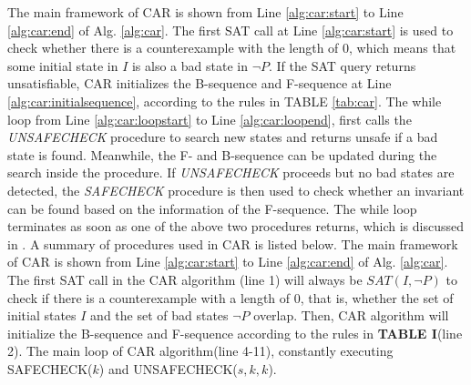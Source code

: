 \iffalse
The CAR algorithm persistently generates new elements and then insert them into F-sequence or B-sequence through repeating calls to the SAT solver until either Safety Check or Unsafety check in TABLE I returns true. Obviously, the $Sys$ holds the property $P$ when Safety Check returns true, while a counterexample is found when UnSafety Check returns true. We will describe the CAR algorithm. followed by the heuristics of the restart policy. 

Here we demonstrate the top-level procedure of CAR algorithm, which is implemented in hundreds of lines of C++. The algorithm takes a system $Sys=(V,I,T)$ and a safety property $P$ as inputs, and the output will be safety when the algorithm finds an invariant to prove the $Sys$ satisfied $P$ or return unsafe when a counterexample is found. \textbf{The Text in red is related to restart policy, please ignore them temporarily}.
\fi 



The main framework of CAR is shown from Line \ref{alg:car:start} to Line \ref{alg:car:end} of Alg. \ref{alg:car}. The first SAT call at Line \ref{alg:car:start} is used to check whether there is a counterexample with the length of $0$, which means that some initial state in $I$ is also a bad state in $\neg P$. If the SAT query returns unsatisfiable, CAR initializes the B-sequence and F-sequence at Line \ref{alg:car:initialsequence}, according to the rules in TABLE \ref{tab:car}. The while loop from Line \ref{alg:car:loopstart} to Line \ref{alg:car:loopend}, first calls the \emph{UNSAFECHECK} procedure to search new states and returns unsafe if a bad state is found. Meanwhile, the F- and B-sequence can be updated during the search inside the procedure. If \emph{UNSAFECHECK} proceeds but no bad states are detected, the \emph{SAFECHECK} procedure is then used to check whether an invariant can be found based on the information of the F-sequence. The while loop terminates as soon as one of the above two procedures returns, which is discussed in \cite{LZZPV17}. A summary of procedures used in CAR is listed below.
\iffalse
The main framework of CAR is shown from Line \ref{alg:car:start} to Line \ref{alg:car:end} of Alg. \ref{alg:car}. The first SAT call in the CAR algorithm (line 1) will always be $\mathit{SAT}(I,\neg P)$ to check if there is a counterexample with a length of $0$, that is, whether the set of initial states $I$ and the set of bad states $\neg P$ overlap. Then, CAR algorithm will initialize the B-sequence and F-sequence according to the rules in \textbf{TABLE I}(line 2). The main loop of CAR algorithm(line 4-11), constantly executing SAFECHECK($k$) and UNSAFECHECK($s,k,k$). 



